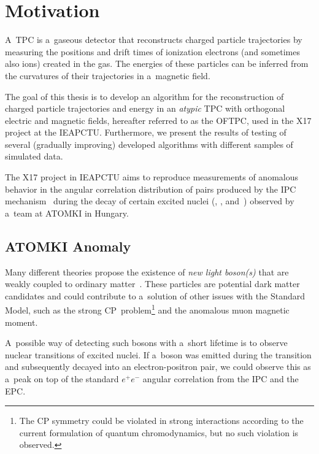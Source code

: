 \chapter{Motivation}
	A~\acf{TPC}\cite{nygren} is a~gaseous detector that reconstructs charged particle trajectories by measuring the positions and drift times of ionization electrons (and sometimes also ions) created in the gas. The energies of these particles can be inferred from the curvatures of their trajectories in a~magnetic field.
	
	The goal of this thesis is to develop an algorithm for the reconstruction of charged particle trajectories and energy in an \emph{atypic} \ac{TPC} with orthogonal electric and magnetic fields, hereafter referred to as the \ac{OFTPC}, used in the X17 project at the \ac{IEAPCTU}. Furthermore, we present the results of testing of several (gradually improving) developed algorithms with different samples of simulated data.
	
	The X17 project in \ac{IEAPCTU} aims to reproduce measurements of anomalous behavior in the angular correlation distribution of pairs produced by the \ac{IPC} mechanism~\cite{IPC} during the decay of certain excited nuclei (, , and~) observed by a~team at ATOMKI in Hungary.
	
	
	\section{ATOMKI Anomaly}
	\label{sec:ATOMKI}
		Many different theories propose the existence of \emph{new light boson(s)} that are weakly coupled to ordinary matter~\cite{dark}. These particles are potential dark matter candidates and could contribute to a~solution of other issues with the Standard Model, such as the strong CP~problem\footnote{The CP symmetry could be violated in strong interactions according to the current formulation of quantum chromodynamics, but no such violation is observed.} and the anomalous muon magnetic moment.
		
		A~possible way of detecting such bosons with a~short lifetime is to observe nuclear transitions of excited nuclei. If a~boson was emitted during the transition and subsequently decayed into an electron\nobreakdash-positron pair, we could observe this as a~peak on top of the standard $e^+e^-$ angular correlation from the \acf{IPC} and the \acf{EPC}.
	
